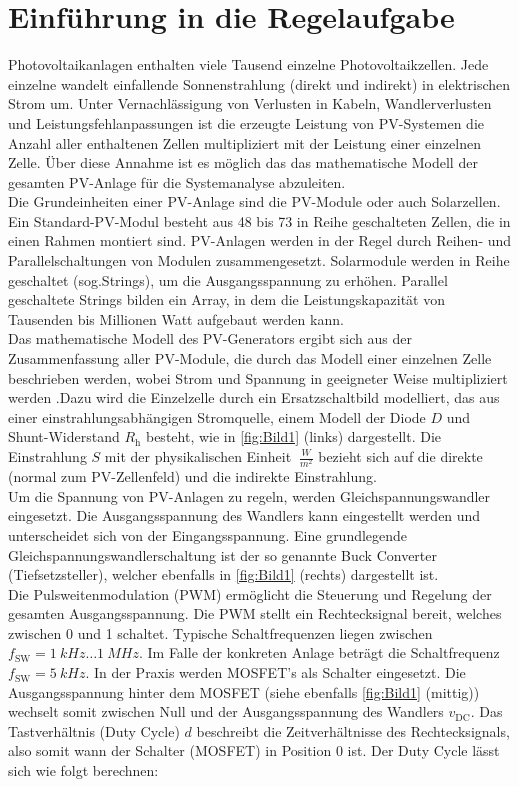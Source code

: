 \section{Einführung in die Regelaufgabe} \label{sec:Einfuehrung}

Photovoltaikanlagen enthalten viele Tausend einzelne Photovoltaikzellen. Jede einzelne wandelt einfallende Sonnenstrahlung (direkt und indirekt) in elektrischen Strom um. Unter Vernachlässigung von Verlusten in Kabeln, Wandlerverlusten und Leistungsfehlanpassungen ist die erzeugte Leistung von PV-Systemen die Anzahl aller enthaltenen Zellen multipliziert mit der Leistung einer einzelnen Zelle. Über diese Annahme ist es möglich das das mathematische Modell der gesamten PV-Anlage für die Systemanalyse abzuleiten. \\
Die Grundeinheiten einer PV-Anlage sind die PV-Module oder auch Solarzellen. Ein Standard-PV-Modul besteht aus 48 bis 73 in Reihe geschalteten Zellen, die in einen Rahmen montiert sind. PV-Anlagen werden in der Regel durch Reihen- und Parallelschaltungen von Modulen zusammengesetzt. Solarmodule werden in Reihe geschaltet (sog.\xspace \glqq Strings\grqq{}), um die Ausgangsspannung zu erhöhen. Parallel geschaltete Strings bilden ein \glqq Array\grqq{}, in dem die Leistungskapazität von Tausenden bis Millionen Watt aufgebaut werden kann. \\
Das mathematische Modell des PV-Generators ergibt sich aus der Zusammenfassung aller PV-Module, die durch das Modell einer einzelnen Zelle beschrieben werden, wobei Strom und Spannung in geeigneter Weise multipliziert werden .Dazu wird die Einzelzelle durch ein Ersatzschaltbild modelliert, das aus einer einstrahlungsabhängigen Stromquelle, einem Modell der Diode $D$ und Shunt-Widerstand $R_{\mathrm{h}}$ besteht, wie in \autoref{fig:Bild1} (links) dargestellt. Die Einstrahlung $S$ mit der physikalischen Einheit $\SI{}{\frac{W}{m^2}}$ bezieht sich auf die direkte (normal zum PV-Zellenfeld) und die indirekte Einstrahlung. \\
\newline
Um die Spannung von PV-Anlagen zu regeln, werden Gleichspannungswandler eingesetzt. Die Ausgangsspannung des Wandlers kann eingestellt werden und unterscheidet sich von der Eingangsspannung. Eine grundlegende Gleichspannungswandlerschaltung ist der so genannte Buck Converter (Tiefsetzsteller), welcher ebenfalls in \autoref{fig:Bild1} (rechts) dargestellt ist. \\
Die Pulsweitenmodulation (PWM) ermöglicht die Steuerung und Regelung der gesamten Ausgangsspannung. Die PWM stellt ein Rechtecksignal bereit, welches zwischen 0 und 1 schaltet. Typische Schaltfrequenzen liegen zwischen $f_{\mathrm{SW}} = \SI{1}{kHz} \ldots \SI{1}{MHz}$. Im Falle der konkreten Anlage beträgt die Schaltfrequenz $f_{\mathrm{SW}} = \SI{5}{kHz}$. In der Praxis werden \zB MOSFET's als Schalter eingesetzt. Die Ausgangsspannung hinter dem MOSFET (siehe ebenfalls \autoref{fig:Bild1} (mittig)) wechselt somit zwischen Null und der Ausgangsspannung des Wandlers $v_{\mathrm{DC}}$. Das Tastverhältnis (Duty Cycle) $d$ beschreibt die Zeitverhältnisse des Rechtecksignals, also somit wann der Schalter (MOSFET) in Position 0  ist. Der Duty Cycle lässt sich wie folgt berechnen:

